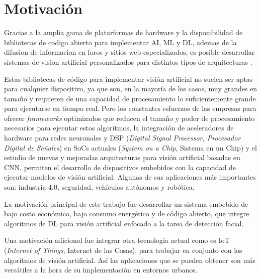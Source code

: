 \section{Motivación}
Gracias a la amplia gama de platarformas de hardware y la disponibilidad de bibliotecas de codigo abierto para implementar AI, ML y DL, ademas de la difusion de informacion en foros y sitios web especializados, es posible desarrollar sistemas de vision artificial personalizados para distintos tipos de arquitecturas \cite{mot_emb}.

Estas bibliotecas de código para implementar visión artificial no suelen ser aptas para cualquier dispositivo, ya que son, en la mayoría de los casos, muy grandes en tamaño y requieren de una capacidad de procesamiento lo suficientemente grande para ejecutarse en tiempo real. Pero los constantes esfuerzos de las empresas para ofrecer \textit{frameworks} optimizados que reducen el tamaño y poder de procesamiento necesarios para ejecutar estos algoritmos, la integración de aceleradores de hardware para redes neuronales y DSP (\textit{Digital Signal Processor, Procesador Digital de Señales}) en SoCs actuales (\textit{System on a Chip}, Sistema en un Chip) y el estudio de nuevas y mejoradas arquitecturas para visión artificial basadas en CNN, permiten el desarrollo de dispositivos embebidos con la capacidad de ejecutar modelos de visión artificial. Algunas de sus aplicaciones más importantes son: industria 4.0, seguridad, vehículos autónomos y robótica.

La motivación principal de este trabajo fue desarrollar un sistema embebido de bajo costo económico, bajo consumo energético y de código abierto, que integre algoritmos de DL para visión artificial enfocado a la tarea de detección facial.

Una motivación adicional fue integrar otra tecnología actual como es IoT (\textit{Internet of Things}, Internet de las Cosas), para trabajar en conjunto con los algoritmos de visión artificial. Así las aplicaciones que se pueden obtener son más versátiles a la hora de su implementación en entornos urbanos.

